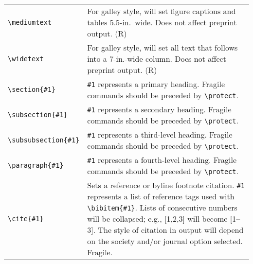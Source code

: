 \begin{quasitable}
\begin{tabular}{lp{4.5in}}
\verb+\mediumtext+  &
             For galley style, will set figure captions and tables
                        5.5-in.\ wide. Does not affect preprint output. (R)
                          \\[4pt]

\verb+\widetext+  &
               For galley style, will set all text that follows into
                 a 7-in.-wide column. Does not affect preprint output. (R)
                          \\[4pt]

\verb+\section{#1}+  &
            \verb+#1+ represents a primary heading. Fragile commands
                        should be preceded by \verb+\protect+.
                          \\[4pt]

\verb+\subsection{#1}+  &
         \verb+#1+ represents a secondary heading. Fragile commands
                        should be preceded by \verb+\protect+.
                          \\[4pt]

\verb+\subsubsection{#1}+  &
      \verb+#1+ represents a third-level heading.
      Fragile commands should be preceded by \verb+\protect+.
                          \\[4pt]

\verb+\paragraph{#1}+  &
          \verb+#1+ represents a fourth-level heading. Fragile commands
                        should be preceded by \verb+\protect+.
                          \\[4pt]

\verb+\cite{#1}+  &
        Sets a reference or byline footnote citation.  \verb+#1+
        represents a list of reference tags used with
        \verb+\bibitem{#1}+.
        Lists of consecutive numbers will be collapsed; e.g.,
        [1,2,3] will become [1--3]. The style of citation in
        output will depend on the society and/or journal
        option selected.
        Fragile.
                          \\[4pt]


\end{tabular}
\end{quasitable}
